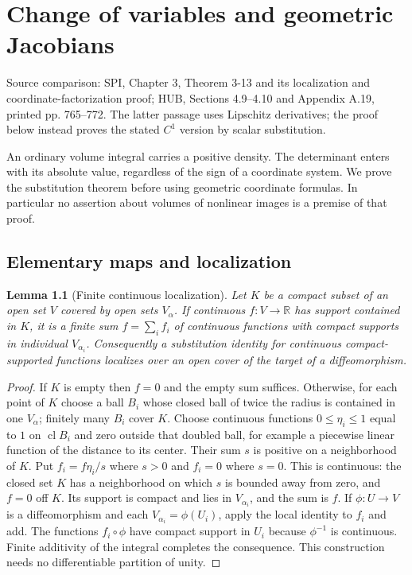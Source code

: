 \documentclass[11pt,oneside,openany]{book}
\newtheorem{lemma}[theorem]{Lemma}
\theoremstyle{definition}
\theoremstyle{remark}
\newcommand{\R}{\mathbb R}
\DeclareMathOperator{\cl}{cl}
\newcommand{\family}[1]{}
\newcommand{\source}[1]{\par\begingroup\small\sffamily\color{black!65}Source comparison: #1\par\endgroup}
\begin{document}


\chapter{Change of variables and geometric Jacobians}
\label{ch:d04-07}
\source{SPI, Chapter 3, Theorem 3-13 and its localization and coordinate-factorization proof; HUB, Sections 4.9--4.10 and Appendix A.19, printed pp. 765--772. The latter passage uses Lipschitz derivatives; the proof below instead proves the stated $C^1$ version by scalar substitution.}

An ordinary volume integral carries a positive density. The determinant enters with its absolute value, regardless of the sign of a coordinate system. We prove the substitution theorem before using geometric coordinate formulas. In particular no assertion about volumes of nonlinear images is a premise of that proof.

\section{Elementary maps and localization}
\family{K04.07.02}\family{K04.07.05}
\begin{lemma}[Finite continuous localization]\label{d04:07:localization}
Let $K$ be a compact subset of an open set $V$ covered by open sets $V_\alpha$. If continuous $f:V\to\R$ has support contained in $K$, it is a finite sum $f=\sum_i f_i$ of continuous functions with compact supports in individual $V_{\alpha_i}$. Consequently a substitution identity for continuous compact-supported functions localizes over an open cover of the target of a diffeomorphism.
\end{lemma}
\begin{proof}
If $K$ is empty then $f=0$ and the empty sum suffices. Otherwise, for each point of $K$ choose a ball $B_i$ whose closed ball of twice the radius is contained in one $V_\alpha$; finitely many $B_i$ cover $K$. Choose continuous functions $0\leq\eta_i\leq1$ equal to $1$ on $\cl B_i$ and zero outside that doubled ball, for example a piecewise linear function of the distance to its center. Their sum $s$ is positive on a neighborhood of $K$. Put $f_i=f\eta_i/s$ where $s>0$ and $f_i=0$ where $s=0$. This is continuous: the closed set $K$ has a neighborhood on which $s$ is bounded away from zero, and $f=0$ off $K$. Its support is compact and lies in $V_{\alpha_i}$, and the sum is $f$. If $\phi:U\to V$ is a diffeomorphism and each $V_{\alpha_i}=\phi(U_i)$, apply the local identity to $f_i$ and add. The functions $f_i\circ\phi$ have compact support in $U_i$ because $\phi^{-1}$ is continuous. Finite additivity of the integral completes the consequence. This construction needs no differentiable partition of unity.
\end{proof}
\end{document}
